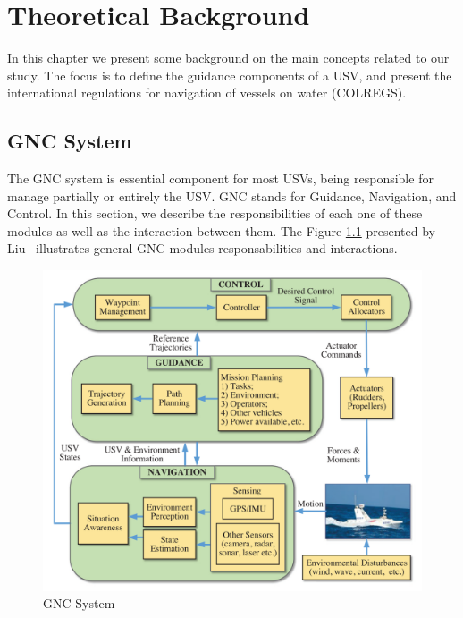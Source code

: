 \chapter{Theoretical Background \label{chap:2_TheoreticalBackground}}


    In this chapter we present some background on the main concepts related to our study. The focus is to define the guidance components of a \ac{USV}, and present the international regulations for navigation of vessels on water (\acs{COLREGS}).

\section{GNC System}
    
    The \acs{GNC} system is essential component for most \acp{USV}, being responsible for manage partially or entirely the \ac{USV}. \acs{GNC} stands for Guidance, Navigation, and Control. In this section, we describe the responsibilities of each one of these modules as well as the interaction between them. The Figure \ref{fig:Liu2016Unmanned_GNCSystem} presented by Liu~\cite{Liu2016Unmanned} illustrates general \ac{GNC} modules responsabilities and interactions.
    
    \begin{figure}[H]
        \centering
        \includegraphics[scale=0.7]{figs/Chap2/Liu2016Unmanned_GNCSystem.png}
        \caption{\ac{GNC} System~\cite{Liu2016Unmanned}}
        \label{fig:Liu2016Unmanned_GNCSystem}
    \end{figure}
    
